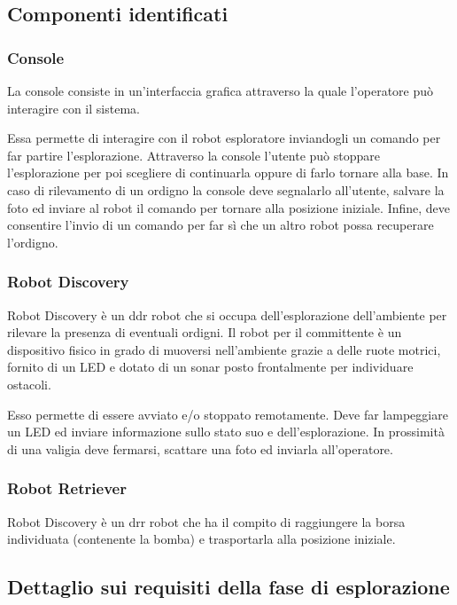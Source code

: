 \subsection{Componenti identificati}

\subsubsection{Console}

La console consiste in un'interfaccia grafica attraverso la quale l'operatore può interagire con il sistema.

Essa permette di interagire con il robot esploratore inviandogli un comando per far partire l'esplorazione.
Attraverso la console l'utente può stoppare l'esplorazione per poi scegliere di continuarla oppure di farlo tornare alla base.
In caso di rilevamento di un ordigno la console deve segnalarlo all'utente, salvare la foto ed inviare al robot il comando per tornare alla posizione iniziale.
Infine, deve consentire l'invio di un comando per far sì che un altro robot possa recuperare l'ordigno.

\subsubsection{Robot Discovery}

Robot Discovery è un ddr robot che si occupa dell'esplorazione dell'ambiente per rilevare la presenza di eventuali ordigni.
Il robot per il committente è un dispositivo fisico in grado di muoversi nell'ambiente grazie a delle ruote motrici, fornito di un LED
e dotato di un sonar posto frontalmente per individuare ostacoli.

Esso permette di essere avviato e/o stoppato remotamente.
Deve far lampeggiare un LED ed inviare informazione sullo stato suo e dell'esplorazione.
In prossimità di una valigia deve fermarsi, scattare una foto ed inviarla all'operatore.

\subsubsection{Robot Retriever}

Robot Discovery è un drr robot che ha il compito di raggiungere la borsa individuata (contenente la bomba) e trasportarla alla posizione iniziale.

\subsection{Dettaglio sui requisiti della fase di esplorazione}

